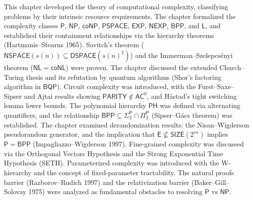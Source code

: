 This chapter developed the theory of computational complexity, classifying problems by their intrinsic resource requirements. The chapter formalized the complexity classes $\mathsf{P}$, $\mathsf{NP}$, $\mathsf{coNP}$, $\mathsf{PSPACE}$, $\mathsf{EXP}$, $\mathsf{NEXP}$, $\mathsf{BPP}$, and $\mathsf{L}$, and established their containment relationships via the hierarchy theorems (Hartmanis--Stearns 1965). Savitch's theorem ($\mathsf{NSPACE}(s(n)) \subseteq \mathsf{DSPACE}(s(n)^2)$) and the Immerman--Szelepcsényi theorem ($\mathsf{NL} = \mathsf{coNL}$) were proven. The chapter discussed the extended Church--Turing thesis and its refutation by quantum algorithms (Shor's factoring algorithm in $\mathsf{BQP}$). Circuit complexity was introduced, with the Furst--Saxe--Sipser and Ajtai results showing $\mathsf{PARITY} \notin \mathsf{AC}^0$, and Håstad's tight switching lemma lower bounds. The polynomial hierarchy $\mathsf{PH}$ was defined via alternating quantifiers, and the relationship $\mathsf{BPP} \subseteq \Sigma_2^{\mathsf{P}} \cap \Pi_2^{\mathsf{P}}$ (Sipser--Gács theorem) was established. The chapter examined derandomization results: the Nisan--Wigderson pseudorandom generator, and the implication that $\mathsf{E} \not\subseteq \mathsf{SIZE}(2^{\epsilon n})$ implies $\mathsf{P} = \mathsf{BPP}$ (Impagliazzo--Wigderson 1997). Fine-grained complexity was discussed via the Orthogonal Vectors Hypothesis and the Strong Exponential Time Hypothesis (SETH). Parameterized complexity was introduced with the W-hierarchy and the concept of fixed-parameter tractability. The natural proofs barrier (Razborov--Rudich 1997) and the relativization barrier (Baker--Gill--Solovay 1975) were analyzed as fundamental obstacles to resolving $\mathsf{P}$ vs $\mathsf{NP}$.

